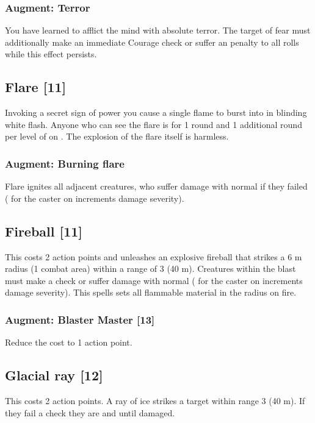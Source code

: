 \subsubsection{Augment: Terror}
You have learned to afflict the mind with absolute terror. The target of fear must additionally make an immediate Courage check or suffer an  penalty to all rolls while this effect persists. 

\subsection{Flare [11]}
\label{spell:flare}
Invoking a secret sign of power you cause a single flame to burst into in blinding white flash. Anyone who can see the flare is  for 1 round and 1 additional round per level of  on . The explosion of the flare itself is harmless.
\subsubsection{Augment: Burning flare}
Flare ignites all adjacent creatures, who suffer damage with normal  if they failed  ( for the caster on  increments damage severity).

\subsection{Fireball [11]}
This costs 2 action points and unleashes an explosive fireball that strikes a 6 m radius (1 combat area) within a range of 3 (40 m). Creatures within the blast must make a  check or suffer damage with normal  ( for the caster on  increments damage severity). This spells sets all flammable material in the radius on fire.
\subsubsection{Augment: Blaster Master [13]}
Reduce the cost to 1 action point.

\subsection{Glacial ray [12]}
This costs 2 action points. A ray of ice strikes a target within range 3 (40 m). If they fail a  check they are  and  until damaged. 
